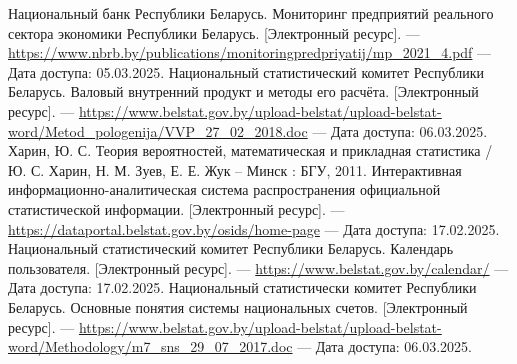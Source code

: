 

\begin{thebibliography}{}
 Национальный банк Республики Беларусь. Мониторинг предприятий реального сектора экономики Республики Беларусь. [Электронный ресурс]. --- \url{https://www.nbrb.by/publications/monitoringpredpriyatij/mp_2021_4.pdf} --- Дата доступа: 05.03.2025.
 Национальный статистический комитет Республики Беларусь. Валовый внутренний продукт и методы его расчёта. [Электронный ресурс]. --- \url{https://www.belstat.gov.by/upload-belstat/upload-belstat-word/Metod_pologenija/VVP_27_02_2018.doc} --- Дата доступа: 06.03.2025.
 Харин, Ю. С. Теория вероятностей, математическая и прикладная статистика / Ю. С. Харин, Н. М. Зуев, Е. Е. Жук -- Минск : БГУ, 2011.
 Интерактивная информационно-аналитическая система распространения официальной статистической информации. [Электронный ресурс]. --- \url{https://dataportal.belstat.gov.by/osids/home-page} --- Дата доступа: 17.02.2025.
 Национальный статистический комитет Республики Беларусь. Календарь пользователя. [Электронный ресурс]. --- \url{https://www.belstat.gov.by/calendar/} --- Дата доступа: 17.02.2025.
 Национальный статистически комитет Республики Беларусь. Основные понятия системы национальных счетов. [Электронный ресурс]. --- \url{https://www.belstat.gov.by/upload-belstat/upload-belstat-word/Methodology/m7_sns_29_07_2017.doc} --- Дата доступа: 06.03.2025.
\end{thebibliography}